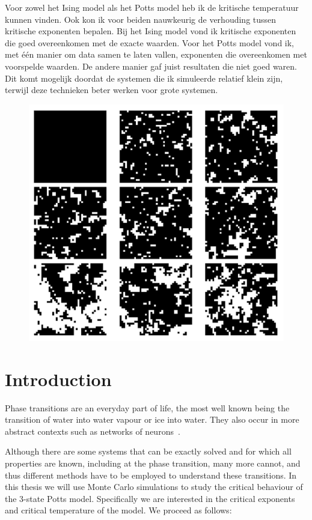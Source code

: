 \documentclass[11pt, a4paper]{report} %
\begin{document}
Voor zowel het Ising model als het Potts model heb ik de kritische temperatuur kunnen vinden.
Ook kon ik voor beiden nauwkeurig de verhouding tussen kritische exponenten bepalen.
Bij het Ising model vond ik kritische exponenten die goed overeenkomen met de exacte waarden.
Voor het Potts model vond ik, met één manier om data samen te laten vallen, exponenten die overeenkomen met voorspelde waarden.
De andere manier gaf juist resultaten die niet goed waren.
Dit komt mogelijk doordat de systemen die ik simuleerde relatief klein zijn, terwijl deze technieken beter werken voor grote systemen.

\begin{figure}
	\centering
	\includegraphics[width=0.7\linewidth]{leken_afbeelding.png}
\end{figure}


\tableofcontents

\chapter*{Introduction}
Phase transitions are an everyday part of life, the most well known being the transition of water into water vapour or ice into water.
They also occur in more abstract contexts such as networks of neurons~\cite{tkacik:2015}.

Although there are some systems that can be exactly solved and for which all properties are known, including at the phase transition, many more cannot, and thus different methods have to be employed to understand these transitions.
In this thesis we will use Monte Carlo simulations to study the critical behaviour of the 3-state Potts model.
Specifically we are interested in the critical exponents and critical temperature of the model.
We proceed as follows:
\end{document}
